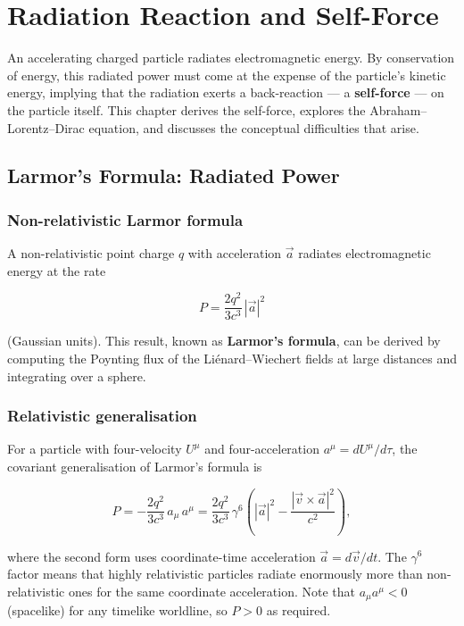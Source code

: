 \chapter{Radiation Reaction and Self-Force}

An accelerating charged particle radiates electromagnetic energy. By conservation of energy, this radiated power must come at the expense of the particle's kinetic energy, implying that the radiation exerts a back-reaction --- a \textbf{self-force} --- on the particle itself. This chapter derives the self-force, explores the Abraham--Lorentz--Dirac equation, and discusses the conceptual difficulties that arise.

\section{Larmor's Formula: Radiated Power}

\subsection{Non-relativistic Larmor formula}

A non-relativistic point charge $q$ with acceleration $\vec{a}$ radiates electromagnetic energy at the rate

\begin{equation}
\boxed{P = \frac{2q^2}{3c^3}\,|\vec{a}|^2}
\end{equation}

(Gaussian units). This result, known as \textbf{Larmor's formula}, can be derived by computing the Poynting flux of the Li\'enard--Wiechert fields at large distances and integrating over a sphere.

\subsection{Relativistic generalisation}

For a particle with four-velocity $U^\mu$ and four-acceleration $a^\mu = dU^\mu/d\tau$, the covariant generalisation of Larmor's formula is

\begin{equation}
\boxed{P = -\frac{2q^2}{3c^3}\,a_\mu\,a^\mu = \frac{2q^2}{3c^3}\,\gamma^6\!\left(|\vec{a}|^2 - \frac{|\vec{v}\times\vec{a}|^2}{c^2}\right),}
\end{equation}

where the second form uses coordinate-time acceleration $\vec{a} = d\vec{v}/dt$. The $\gamma^6$ factor means that highly relativistic particles radiate enormously more than non-relativistic ones for the same coordinate acceleration. Note that $a_\mu a^\mu < 0$ (spacelike) for any timelike worldline, so $P > 0$ as required.

